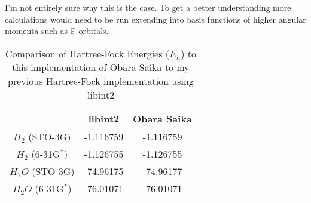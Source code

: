 \documentclass{article}
\begin{document}
I'm not entirely sure why this is the case. To get a better understanding more calculations would need to be run extending into basis functions of higher angular momenta such as F orbitals.

\begin{table}[h]
\centering
\begin{tabular}{|c|c|c|}
\hline
  & libint2 & Obara Saika\\
 \hline
 $H_2$ (STO-3G)    & -1.116759 &-1.116759 \\
 $H_2$ (6-31G$^*$) & -1.126755 &-1.126755 \\
 $H_2O$ (STO-3G)   & -74.96175 &-74.96177 \\
 $H_2O$ (6-31G$^*$)& -76.01071 &-76.01071 \\
 \hline
 \end{tabular}
 \caption{Comparison of Hartree-Fock Energies ($E_h$) to this implementation of Obara Saika to my previous Hartree-Fock implementation using libint2}
 \label{tab:hfcomp}
 \end{table}
\end{document}
